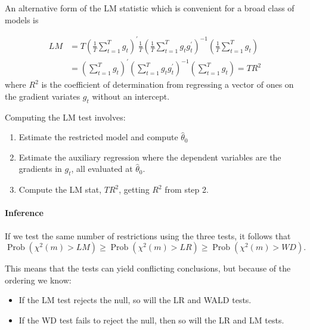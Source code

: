 \documentclass[11pt]{article}
\begin{document}
An alternative form of the LM statistic which is convenient for a broad class of models is

\begin{equation}
\begin{aligned}
L M & =T\left(\frac{1}{T} \sum_{t=1}^T g_t\right)^{\prime} \frac{1}{T}\left(\frac{1}{T} \sum_{t=1}^T g_t g_t^{\prime}\right)^{-1}\left(\frac{1}{T} \sum_{t=1}^T g_t\right) \\
& =\left(\sum_{t=1}^T g_t\right)^{\prime}\left(\sum_{t=1}^T g_t g_t^{\prime}\right)^{-1}\left(\sum_{t=1}^T g_t\right)=T R^2
\end{aligned}
\end{equation}
where $R^2$ is the coefficient of determination from regressing a vector of ones on the gradient variates $g_t$ without an intercept.

\begin{procedure}
    Computing the LM test involves:
    \begin{enumerate}
        \item Estimate the restricted model and compute $\hat{\theta}_0$
        \item Estimate the auxiliary regression where the dependent variables are the gradients in $g_t$, all evaluated at $\hat{\theta}_0$.
        \item Compute the LM stat, $TR^2$, getting $R^2$ from step 2.
    \end{enumerate}
\end{procedure}

\paragraph{Inference}
If we test the same number of restrictions using the three tests, it follows that
\begin{equation}
\operatorname{Prob}\left(\chi^2(m)>L M\right) \geq \operatorname{Prob}\left(\chi^2(m)>L R\right) \geq \operatorname{Prob}\left(\chi^2(m)>W D\right) .
\end{equation}

This means that the tests can yield conflicting conclusions, but because of the ordering we know:
\begin{itemize}
    \item If the LM test rejects the null, so will the LR and WALD tests.
    \item If the WD test fails to reject the null, then so will the LR and LM tests.
\end{itemize}
\end{document}
